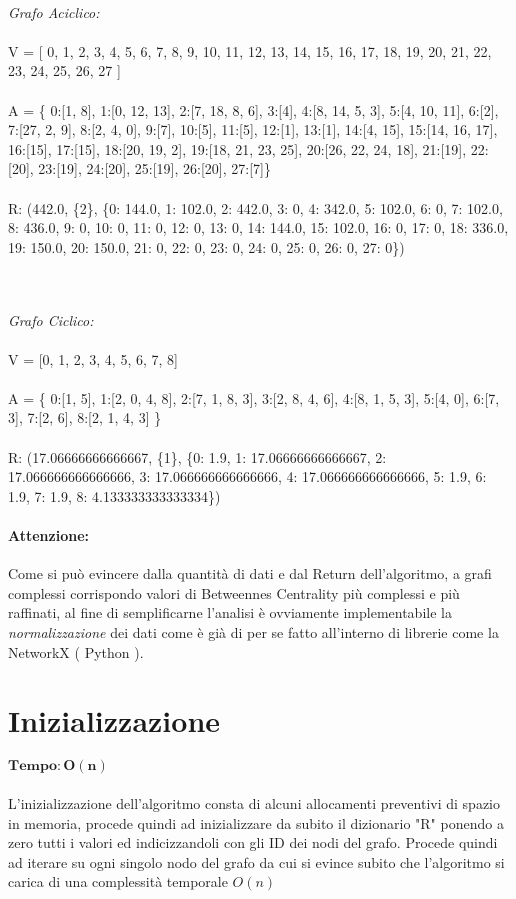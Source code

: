 \emph{ \\Grafo Aciclico: \\ \\}
V = [ 0, 1, 2, 3, 4, 5, 6, 7, 8, 9, 10, 11, 12, 13, 14, 15, 16, 17, 18, 19, 20, 21, 22, 23, 24, 25, 26, 27 ]
\\ \\
A = \{ 0:[1, 8],  1:[0, 12, 13], 2:[7, 18, 8, 6], 3:[4], 4:[8, 14, 5, 3], 5:[4, 10, 11], 6:[2], 7:[27, 2, 9], 8:[2, 4, 0], 9:[7], 10:[5], 11:[5], 12:[1], 13:[1], 14:[4, 15], 15:[14, 16, 17], 16:[15], 17:[15], 18:[20, 19, 2], 19:[18, 21, 23, 25], 20:[26, 22, 24, 18], 21:[19], 22:[20], 23:[19], 24:[20], 25:[19], 26:[20], 27:[7]\}
\\ \\
R: (442.0, \{2\}, \{0: 144.0, 1: 102.0, 2: 442.0, 3: 0, 4: 342.0, 5: 102.0, 6: 0, 7: 102.0, 8: 436.0, 9: 0, 10: 0, 11: 0, 12: 0, 13: 0, 14: 144.0, 15: 102.0, 16: 0, 17: 0, 18: 336.0, 19: 150.0, 20: 150.0, 21: 0, 22: 0, 23: 0, 24: 0, 25: 0, 26: 0, 27: 0\})


\emph{\\ \\ Grafo Ciclico: \\ \\}
V = [0, 1, 2, 3, 4, 5, 6, 7, 8]
\\ \\
A = \{ 0:[1, 5], 1:[2, 0, 4, 8], 2:[7, 1, 8, 3], 3:[2, 8, 4, 6], 4:[8, 1, 5, 3], 5:[4, 0], 6:[7, 3], 7:[2, 6], 8:[2, 1, 4, 3] \}
\\ \\
R: (17.06666666666667, \{1\}, \{0: 1.9, 1: 17.06666666666667, 2: 17.066666666666666, 3: 17.066666666666666, 4: 17.066666666666666, 5: 1.9, 6: 1.9, 7: 1.9, 8: 4.133333333333334\})
\\
\noindent 
\paragraph{Attenzione:}Come si può evincere dalla quantità di dati e dal Return dell'algoritmo, a grafi complessi corrispondo valori di Betweennes Centrality più complessi e più raffinati, al fine di semplificarne l'analisi è ovviamente implementabile la \emph{normalizzazione} dei dati come è già di per se fatto all'interno di librerie come la NetworkX ( Python ).


\newpage

\section{Inizializzazione}
$\mathbf{Tempo: O(n)}$\\ 	\\
L'inizializzazione dell'algoritmo consta di alcuni allocamenti preventivi di spazio in memoria, procede quindi ad inizializzare da subito il dizionario "R" ponendo a zero tutti i valori ed indicizzandoli con gli ID dei nodi del grafo. Procede quindi ad iterare su ogni singolo nodo del grafo da cui si evince subito che l'algoritmo si carica di una complessità temporale $O(n)$

